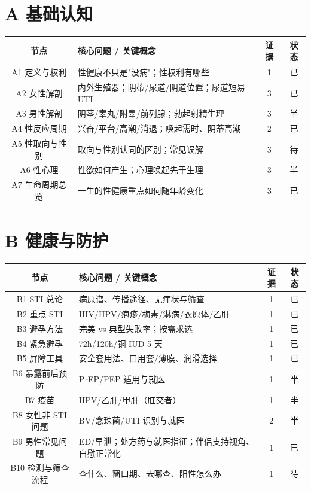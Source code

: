 \section{A 基础认知}

\begin{tabularx}{\linewidth}{C X c c}
\toprule
\textbf{节点} & \textbf{核心问题 / 关键概念} & \textbf{证据} & \textbf{状态} \\
\midrule
A1 定义与权利 & 性健康不只是"没病"；性权利有哪些 & 1 & 已 \\
A2 女性解剖 & 内外生殖器；阴蒂/尿道/阴道位置；尿道短易 UTI & 3 & 已 \\
A3 男性解剖 & 阴茎/睾丸/附睾/前列腺；勃起射精生理 & 3 & 半 \\
A4 性反应周期 & 兴奋/平台/高潮/消退；唤起需时、阴蒂高潮 & 2 & 已 \\
A5 性取向与性别 & 取向与性别认同的区别；常见误解 & 3 & 待 \\
A6 性心理 & 性欲如何产生；心理唤起先于生理 & 3 & 半 \\
A7 生命周期总览 & 一生的性健康重点如何随年龄变化 & 3 & 已 \\
\bottomrule
\end{tabularx}

\section{B 健康与防护}

\begin{tabularx}{\linewidth}{C X c c}
\toprule
\textbf{节点} & \textbf{核心问题 / 关键概念} & \textbf{证据} & \textbf{状态} \\
\midrule
B1 STI 总论 & 病原谱、传播途径、无症状与筛查 & 1 & 已 \\
B2 重点 STI & HIV/HPV/疱疹/梅毒/淋病/衣原体/乙肝 & 1 & 已 \\
B3 避孕方法 & 完美 vs 典型失败率；按需求选 & 1 & 已 \\
B4 紧急避孕 & 72h/120h/铜 IUD 5 天 & 1 & 已 \\
B5 屏障工具 & 安全套用法、口用套/薄膜、润滑选择 & 1 & 已 \\
B6 暴露前后预防 & PrEP/PEP 适用与就医 & 1 & 半 \\
B7 疫苗 & HPV/乙肝/甲肝（肛交者） & 1 & 半 \\
B8 女性非 STI 问题 & BV/念珠菌/UTI 识别与就医 & 2 & 半 \\
B9 男性常见问题 & ED/早泄；处方药与就医指征；伴侣支持视角、自慰正常化 & 1 & 已 \\
B10 检测与筛查流程 & 查什么、窗口期、去哪查、阳性怎么办 & 1 & 待 \\
\bottomrule
\end{tabularx}

